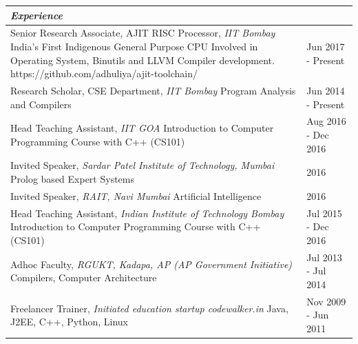 \documentclass[a4paper,12pt]{article}
\newcommand{\Heading}[1]{\textbf{\itshape\normalsize #1}}
\begin{document}
\begin{flushleft}
    \vspace{3mm}
\begin{tabular}{ m{}| R{0.25\textwidth}}
\multicolumn{2}{l}{\Heading{Experience}} \\
    \hline
    \hline
    \rule[3ex]{0ex}{0ex}Senior Research Associate, AJIT RISC Processor, \textit{IIT Bombay} 
    \newline{}India's First Indigenous General Purpose CPU
    \newline{}Involved in Operating System, Binutils and LLVM Compiler development.
    \newline{}https://github.com/adhuliya/ajit-toolchain/
    & Jun 2017 - Present\\ \hline

    \rule[3ex]{0ex}{0ex}Research Scholar, CSE Department, \textit{IIT Bombay} \newline{}Program Analysis and Compilers & Jun 2014 - Present\\ \hline

    \rule[3ex]{0ex}{0ex}Head Teaching Assistant, \textit{IIT GOA} \newline{}Introduction to Computer Programming Course with C++ (CS101) & Aug 2016 - Dec 2016\\ \hline

    \rule[3ex]{0ex}{0ex}Invited Speaker, \textit{Sardar Patel Institute of Technology, Mumbai} \newline{}Prolog based Expert Systems & 2016\\ \hline

    \rule[3ex]{0ex}{0ex}Invited Speaker, \textit{RAIT, Navi Mumbai} \newline{}Artificial Intelligence & 2016\\ \hline

    \rule[3ex]{0ex}{0ex}Head Teaching Assistant, \textit{Indian Institute of Technology Bombay} \newline{}Introduction to Computer Programming Course with C++ (CS101) & Jul 2015 - Dec 2016\\ \hline

    \rule[3ex]{0ex}{0ex}Adhoc Faculty, \textit{RGUKT, Kadapa, AP (AP Government Initiative)} \newline{}Compilers, Computer Architecture& Jul 2013 - Jul 2014\\ \hline

    \rule[3ex]{0ex}{0ex}Freelancer Trainer, \textit{Initiated education startup codewalker.in} \newline{}Java, J2EE, C++, Python, Linux& Nov 2009 - Jun 2011\\ \hline 


\end{tabular}
\end{flushleft}
\end{document}
